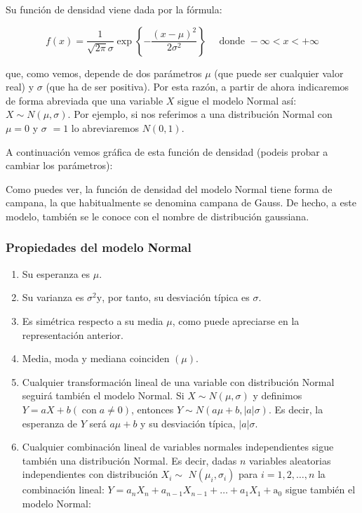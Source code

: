 \documentclass[
  a4paper,
  DIV=11,
  numbers=noendperiod]{scrreprt}
\begin{document}
Su función de densidad viene dada por la fórmula:

\[
f(x)=\frac{1}{\sqrt{2 \pi} \sigma} \exp \left\{-\frac{(x-\mu)^{2}}{2 \sigma^{2}}\right\} \quad \text { donde }-\infty<x<+\infty
\]

que, como vemos, depende de dos parámetros \(\mu\) (que puede ser
cualquier valor real) y \(\sigma\) (que ha de ser positiva). Por esta
razón, a partir de ahora indicaremos de forma abreviada que una variable
\(X\) sigue el modelo Normal así: \(X \sim N(\mu, \sigma)\). Por
ejemplo, si nos referimos a una distribución Normal con \(\mu=0\) y
\(\sigma\) \(=1\) lo abreviaremos \(N(0,1)\).

A continuación vemos gráfica de esta función de densidad (podeis probar
a cambiar los parámetros):

Como puedes ver, la función de densidad del modelo Normal tiene forma de
campana, la que habitualmente se denomina campana de Gauss. De hecho, a
este modelo, también se le conoce con el nombre de distribución
gaussiana.

\subsubsection{Propiedades del modelo
Normal}\label{propiedades-del-modelo-normal}

\begin{enumerate}
\def\labelenumi{\arabic{enumi}.}
\item
  Su esperanza es \(\mu\).
\item
  Su varianza es \(\sigma^{2} \mathrm{y}\), por tanto, su desviación
  típica es \(\sigma\).
\item
  Es simétrica respecto a su media \(\mu\), como puede apreciarse en la
  representación anterior.
\item
  Media, moda y mediana coinciden \((\mu)\).
\item
  Cualquier transformación lineal de una variable con distribución
  Normal seguirá también el modelo Normal. Si \(X \sim N(\mu, \sigma)\)
  y definimos \(Y=a X+b(\operatorname{con} a \neq 0)\), entonces
  \(Y \sim N(a \mu+b,|a| \sigma)\). Es decir, la esperanza de \(Y\) será
  \(a \mu+b\) y su desviación típica, \(|a| \sigma\).
\item
  Cualquier combinación lineal de variables normales independientes
  sigue también una distribución Normal. Es decir, dadas \(n\) variables
  aleatorias independientes con distribución \(X_{i} \sim\)
  \(N\left(\mu_{i}, \sigma_{i}\right)\) para \(i=1,2, \ldots, n\) la
  combinación lineal:
  \(Y=a_{n} X_{n}+a_{n-1} X_{n-1}+\ldots+a_{1} X_{1}+\mathrm{a}_{0}\)
  sigue también el modelo Normal:
\end{enumerate}
\end{document}
